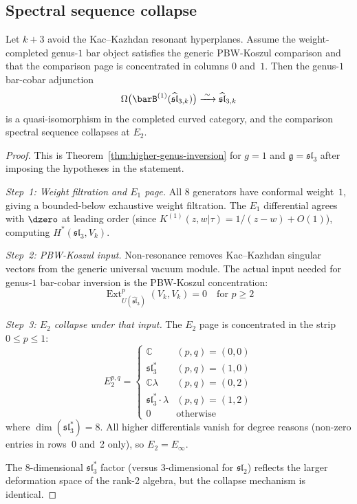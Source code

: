 \subsection{Spectral sequence collapse}

\begin{theorem}
\label{thm:sl3-genus1-inversion}
Let $k+3$ avoid the Kac--Kazhdan resonant hyperplanes.  Assume the
weight-completed genus-$1$ bar object satisfies the generic PBW-Koszul
comparison and that the comparison page is concentrated in columns
$0$ and~$1$.  Then the genus-$1$ bar-cobar adjunction
\begin{equation}
\Omega\bigl(\barB^{(1)}(\widehat{\mathfrak{sl}}_{3,k})\bigr) \xrightarrow{\;\sim\;} \widehat{\mathfrak{sl}}_{3,k}
\end{equation}
is a quasi-isomorphism in the completed curved category, and the
comparison spectral sequence collapses at $E_2$.
\end{theorem}

\begin{proof}
This is Theorem~\ref{thm:higher-genus-inversion} for $g=1$ and
$\mathfrak{g}=\mathfrak{sl}_3$ after imposing the hypotheses in the
statement.

\emph{Step~1: Weight filtration and $E_1$ page.}
All $8$ generators have conformal weight~$1$, giving a bounded-below exhaustive weight filtration. The $E_1$ differential agrees with $\dzero$ at leading order (since $K^{(1)}(z,w|\tau) = 1/(z-w) + O(1)$), computing $H^*(\mathfrak{sl}_3, V_k)$.

\emph{Step~2: PBW-Koszul input.}
Non-resonance removes Kac--Kazhdan singular vectors from the generic
universal vacuum module.  The actual input needed for genus-$1$
bar-cobar inversion is the PBW-Koszul concentration:
\begin{equation}
\operatorname{Ext}^p_{U(\widehat{\mathfrak{sl}}_3)}(V_k, V_k) = 0 \quad \text{for } p \geq 2
\end{equation}

\emph{Step~3: $E_2$ collapse under that input.}
The $E_2$ page is concentrated in the strip $0 \leq p \leq 1$:
\begin{equation}\label{eq:sl3-E2-page}
E_2^{p,q} = \begin{cases}
\mathbb{C} & (p,q) = (0,0) \\
\mathfrak{sl}_3^* & (p,q) = (1,0) \\
\mathbb{C}\lambda & (p,q) = (0,2) \\
\mathfrak{sl}_3^* \cdot \lambda & (p,q) = (1,2) \\
0 & \text{otherwise}
\end{cases}
\end{equation}
where $\dim(\mathfrak{sl}_3^*) = 8$. All higher differentials vanish for degree reasons (non-zero entries in rows~0 and~2 only), so $E_2 = E_\infty$.

The 8-dimensional $\mathfrak{sl}_3^*$ factor (versus 3-dimensional for $\mathfrak{sl}_2$) reflects the larger deformation space of the rank-2 algebra, but the collapse mechanism is identical.
\end{proof}


